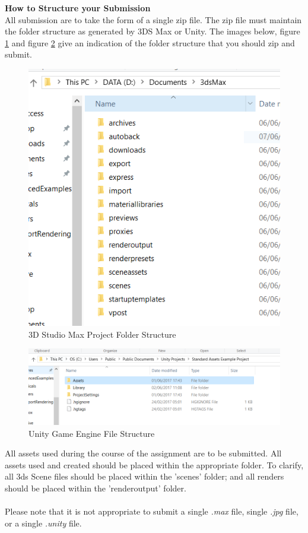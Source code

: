 \textbf{How to Structure your Submission}
\\
All submission are to take the form of a single zip file.  The zip file must maintain the folder structure as generated by 3DS Max or Unity.   The images below, figure \ref{fig:3dsstructure} and figure \ref{fig:unity} give an indication of the folder structure that you should zip and submit.

\begin{figure}[h]
	\centering
	\includegraphics[width=0.5\linewidth]{img/3dsStructure.jpg}
	\caption{3D Studio Max Project Folder Structure}
	\label{fig:3dsstructure}
\end{figure}
\begin{figure}[h]
	\centering
	\includegraphics[width=0.9\linewidth]{img/Unity.jpg}
	\caption{Unity Game Engine File Structure}
	\label{fig:unity}
\end{figure}

All assets used during the course of the assignment are to be submitted.  All assets used and created should be placed within the appropriate folder.  To clarify, all 3ds Scene files should be placed within the 'scenes' folder; and all renders should be placed within the 'renderoutput' folder.
\\
\\
Please note that it is not appropriate to submit a single \textit{.max} file, single \textit{.jpg} file, or a single \textit{.unity} file.  